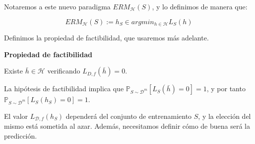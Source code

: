 \begin{enumerate}
Notaremos a este nuevo paradigma $ERM_{\mathcal{H}}(S)$, y lo definimos de manera que:

\[ERM_{\mathcal{H}}(S) := h_S \in argmin_{h\in \mathcal{H}} L_S(h)\]

Definimos la propiedad de factibilidad, que usaremos más adelante.

\begin{definition}
\textbf{Propiedad de factibilidad}

Existe  $\bar{h} \in \mathcal{H}$ verificando $L_{D,f}(\bar{h}) = 0$.
\end{definition}

La hipótesis de factibilidad implica que $\mathbb{P}_{S\sim \mathcal{D}^m}[L_S(\bar{h})=0] = 1$, y por tanto $\mathbb{P}_{S\sim \mathcal{D}^m}[L_S(h_S)=0]=1$.

El valor $L_{\mathcal{D},f}(h_S)$ dependerá del conjunto de entrenamiento $S$, y la elección del mismo está sometida al azar. Además, necesitamos definir cómo de buena será la predicción.
\end{enumerate}
